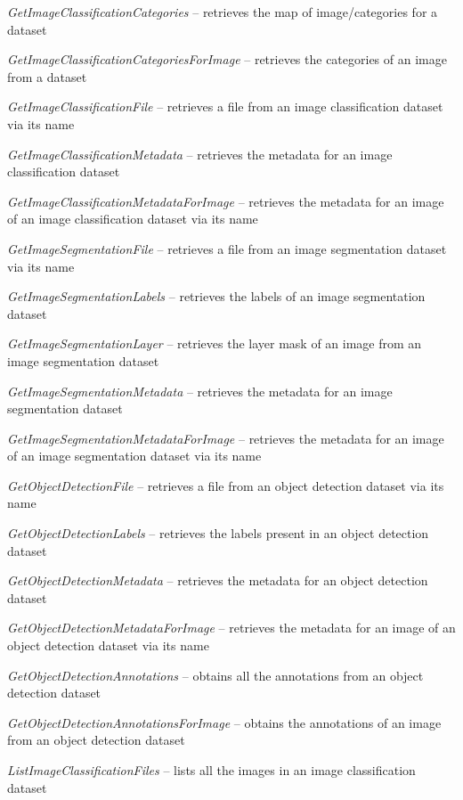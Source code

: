 \documentclass[a4paper]{book}
\begin{document}
\begin{tight_itemize}
  \item \textit{GetImageClassificationCategories} -- retrieves the map of image/categories for a dataset
  \item \textit{GetImageClassificationCategoriesForImage} -- retrieves the categories of an image from a dataset
  \item \textit{GetImageClassificationFile} -- retrieves a file from an image classification dataset via its name
  \item \textit{GetImageClassificationMetadata} -- retrieves the metadata for an image classification dataset
  \item \textit{GetImageClassificationMetadataForImage} -- retrieves the metadata for an image of an image classification dataset via its name
  \item \textit{GetImageSegmentationFile} -- retrieves a file from an image segmentation dataset via its name
  \item \textit{GetImageSegmentationLabels} -- retrieves the labels of an image segmentation dataset
  \item \textit{GetImageSegmentationLayer} -- retrieves the layer mask of an image from an image segmentation dataset
  \item \textit{GetImageSegmentationMetadata} -- retrieves the metadata for an image segmentation dataset
  \item \textit{GetImageSegmentationMetadataForImage} -- retrieves the metadata for an image of an image segmentation dataset via its name
  \item \textit{GetObjectDetectionFile} -- retrieves a file from an object detection dataset via its name
  \item \textit{GetObjectDetectionLabels} -- retrieves the labels present in an object detection dataset
  \item \textit{GetObjectDetectionMetadata} -- retrieves the metadata for an object detection dataset
  \item \textit{GetObjectDetectionMetadataForImage} -- retrieves the metadata for an image of an object detection dataset via its name
  \item \textit{GetObjectDetectionAnnotations} -- obtains all the annotations from an object detection dataset
  \item \textit{GetObjectDetectionAnnotationsForImage} -- obtains the annotations of an image from an object detection dataset
  \item \textit{ListImageClassificationFiles} -- lists all the images in an image classification dataset

\end{tight_itemize}
\end{document}
